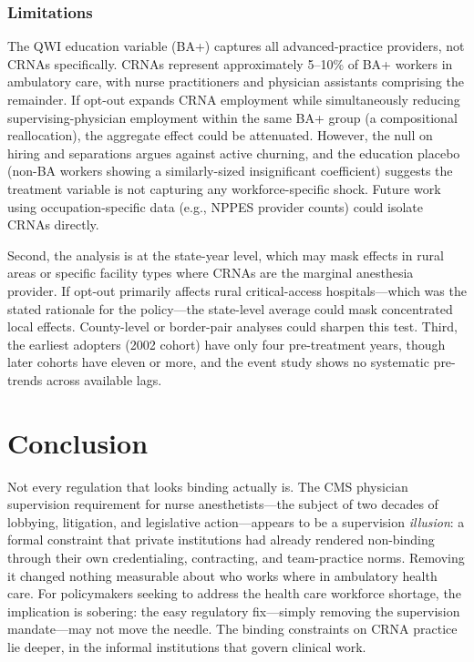 \documentclass[12pt]{article}
\begin{document}
\subsubsection*{Limitations} The QWI education variable (BA+) captures all advanced-practice providers, not CRNAs specifically. CRNAs represent approximately 5--10\% of BA+ workers in ambulatory care, with nurse practitioners and physician assistants comprising the remainder. If opt-out expands CRNA employment while simultaneously reducing supervising-physician employment within the same BA+ group (a compositional reallocation), the aggregate effect could be attenuated. However, the null on hiring and separations argues against active churning, and the education placebo (non-BA workers showing a similarly-sized insignificant coefficient) suggests the treatment variable is not capturing any workforce-specific shock. Future work using occupation-specific data (e.g., NPPES provider counts) could isolate CRNAs directly.

Second, the analysis is at the state-year level, which may mask effects in rural areas or specific facility types where CRNAs are the marginal anesthesia provider. If opt-out primarily affects rural critical-access hospitals---which was the stated rationale for the policy---the state-level average could mask concentrated local effects. County-level or border-pair analyses could sharpen this test. Third, the earliest adopters (2002 cohort) have only four pre-treatment years, though later cohorts have eleven or more, and the event study shows no systematic pre-trends across available lags.


\section{Conclusion}

Not every regulation that looks binding actually is. The CMS physician supervision requirement for nurse anesthetists---the subject of two decades of lobbying, litigation, and legislative action---appears to be a supervision \emph{illusion}: a formal constraint that private institutions had already rendered non-binding through their own credentialing, contracting, and team-practice norms. Removing it changed nothing measurable about who works where in ambulatory health care. For policymakers seeking to address the health care workforce shortage, the implication is sobering: the easy regulatory fix---simply removing the supervision mandate---may not move the needle. The binding constraints on CRNA practice lie deeper, in the informal institutions that govern clinical work.
\end{document}
